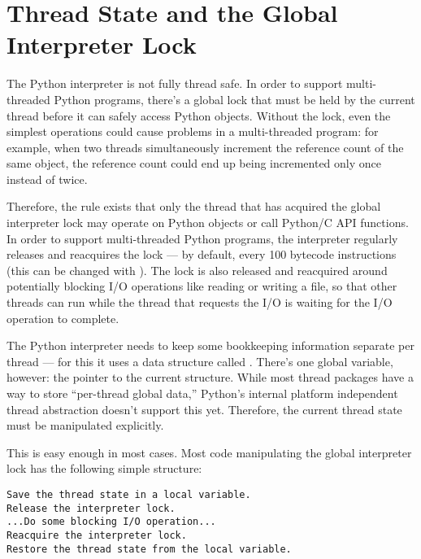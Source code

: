 
\section{Thread State and the Global Interpreter Lock
         \label{threads}}


The Python interpreter is not fully thread safe.  In order to support
multi-threaded Python programs, there's a global lock that must be
held by the current thread before it can safely access Python objects.
Without the lock, even the simplest operations could cause problems in
a multi-threaded program: for example, when two threads simultaneously
increment the reference count of the same object, the reference count
could end up being incremented only once instead of twice.

Therefore, the rule exists that only the thread that has acquired the
global interpreter lock may operate on Python objects or call Python/C
API functions.  In order to support multi-threaded Python programs,
the interpreter regularly releases and reacquires the lock --- by
default, every 100 bytecode instructions (this can be changed with
).  The lock is also released and
reacquired around potentially blocking I/O operations like reading or
writing a file, so that other threads can run while the thread that
requests the I/O is waiting for the I/O operation to complete.

The Python interpreter needs to keep some bookkeeping information
separate per thread --- for this it uses a data structure called
.  There's one global
variable, however: the pointer to the current
 structure.  While most
thread packages have a way to store ``per-thread global data,''
Python's internal platform independent thread abstraction doesn't
support this yet.  Therefore, the current thread state must be
manipulated explicitly.

This is easy enough in most cases.  Most code manipulating the global
interpreter lock has the following simple structure:

\begin{verbatim}
Save the thread state in a local variable.
Release the interpreter lock.
...Do some blocking I/O operation...
Reacquire the interpreter lock.
Restore the thread state from the local variable.
\end{verbatim}


